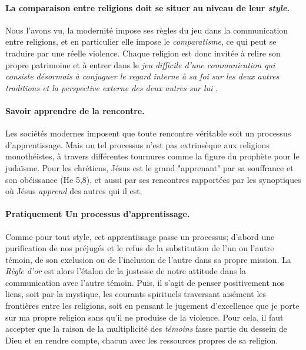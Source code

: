 \paragraph{La comparaison entre religions doit se situer au niveau de leur \textit{style}.} Nous l'avons vu, la modernité impose ses règles du jeu dans la communication entre religions, et en particulier elle impose le \textit{comparatisme}, ce qui peut se traduire par une réelle violence. Chaque religion est donc invitée à relire son propre patrimoine et à entrer dans le \textit{jeu difficile d'une communication qui consiste désormais à conjuguer le regard interne à sa foi sur les deux autres traditions et la perspective externe des deux autres sur lui} \cite[p. 788]{theobald_christianisme_2007}.

\paragraph{Savoir apprendre de la rencontre.} Les sociétés modernes imposent que toute rencontre véritable soit un processus d'apprentissage. Mais un tel processus n'est pas extrinsèque aux religions monothéistes, à travers différentes tournures  comme la figure du prophète pour le judaïsme. Pour les chrétiens, Jésus est le grand "apprenant" par sa souffrance et son obéissance (He 5,8), et  aussi par ses rencontres rapportées par les synoptiques où Jésus \textit{apprend} des autres qui il est.  

\paragraph{Pratiquement Un processus d'apprentissage.} Comme pour tout style, cet apprentissage passe un processus; d'abord une purification de nos préjugés et le refus de la substitution de l'un ou l'autre témoin, de son exclusion ou de l'inclusion de l'autre dans sa propre mission. La \textit{Règle d'or} est alors l'étalon de la justesse de notre attitude dans la communication avec l'autre témoin. Puis, il s'agit de penser positivement nos liens, soit par la mystique, les courants spirituels traversant aisément les frontières entre les religions,  soit en pensant le jugement d'excellence que je porte sur ma propre religion sans qu'il ne produise de la violence. Pour cela, il faut  accepter que la raison de la multiplicité des \textit{témoins} fasse partie du dessein de Dieu et en rendre compte, chacun avec les ressources propres de sa religion. 

\begin{comment}
[Style de vie messianique]
Ce style de vie consiste à vivre l’hospitalité qui suscite la mue
d’identité des personnes rencontrées (par Jésus). « La foi chrétienne n’est pas une doctrine
(…) mais un ‘style de vie’ ou une manière de vivre de la sainteté même de Dieu : seule
l’expérience effective de l’Esprit de sainteté nous permet de confesser et de comprendre un
jour l’indépassable excellence du Fils unique du Père » (L’unique et ses témoins, 19 ).\cite[p. 794]{theobald_christianisme_2007}
    
\end{comment}


